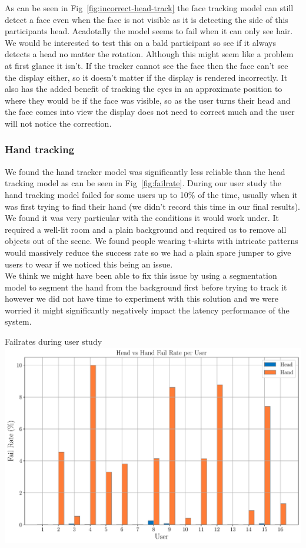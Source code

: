 As can be seen in Fig~\ref{fig:incorrect-head-track} the face tracking model can still detect a face even when the face is not visible as it is detecting the side of this participants head. Acadotally the model seems to fail when it can only see hair. We would be interested to test this on a bald participant so see if it always detects a head no matter the rotation. Although this might seem like a problem at first glance it isn't. If the tracker cannot see the face then the face can't see the display either, so it doesn't matter if the display is rendered incorrectly. It also has the added benefit of tracking the eyes in an approximate position to where they would be if the face was visible, so as the user turns their head and the face comes into view the display does not need to correct much and the user will not notice the correction.

\subsubsection{Hand tracking}

We found the hand tracker model was significantly less reliable than the head tracking model as can be seen in Fig~\ref{fig:failrate}. During our user study the hand tracking model failed for some users up to  10\% of the time, usually when it was first trying to find their hand (we didn't record this time in our final results). We found it was very particular with the conditions it would work under. It required a well-lit room and a plain background and required us to remove all objects out of the scene. We found people wearing t-shirts with intricate patterns would massively reduce the success rate so we had a plain spare jumper to give users to wear if we noticed this being an issue. \\

We think we might have been able to fix this issue by using a segmentation model to segment the hand from the background first before trying to track it however we did not have time to experiment with this solution and we were worried it might significantly negatively impact the latency performance of the system.

\begin{figureBox}[label={fig:failrate}, width=0.8\linewidth]{Failrates during user study}
	\includegraphics[width = 1.0\linewidth]{./evaluation/figures/failrate.pdf}
\end{figureBox}

